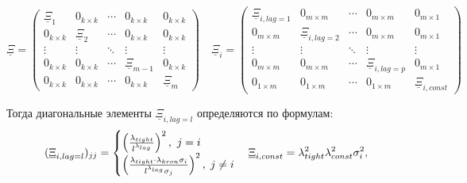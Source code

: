 \documentclass[11pt]{article} %
\newcommand{\prior}{\underline}
\begin{document}
\begin{equation*}
\prior \Xi=\begin{pmatrix}
\prior \Xi_1&0_{k\times k}&\cdots&0_{k\times k}&0_{k\times k}\\
0_{k\times k}& \prior \Xi_2& \cdots &0_{k\times k}&0_{k\times k}\\
\vdots &\vdots& \ddots&\vdots& \vdots\\
0_{k\times k}&0_{k\times k}&\cdots&\prior\Xi_{m-1} & 0_{k\times k}\\
0_{k\times k}&0_{k\times k}&\cdots&0_{k\times k}&\prior \Xi_m
\end{pmatrix}
\quad
\prior \Xi_i=\begin{pmatrix}
\prior \Xi_{i,lag=1}&0_{m\times m}&\cdots&0_{m\times m}&0_{m\times 1}\\
0_{m\times m}& \prior \Xi_{i,lag=2}& \cdots &0_{m\times m}&0_{m\times 1}\\
\vdots &\vdots& \ddots& \vdots&\vdots\\
0_{m\times m}&0_{m\times m}&\cdots&\prior \Xi_{i,lag=p}&0_{m\times 1}\\
0_{1\times m}&0_{1\times m}&\cdots&0_{1\times m}&\prior \Xi_{i,const}
\end{pmatrix}
\end{equation*}

Тогда  диагональные элементы  $\prior \Xi_{i,lag=l}$ определяются по формулам:
\begin{equation}
(\prior \Xi_{i,lag=l})_{jj}
=\begin{cases}
\left(\frac{\lambda_{tight}}{l^{\lambda_{lag}}}\right)^2,\ j=i\\
\left(\frac{\lambda_{tight}\cdot\lambda_{kron}\sigma_i}{l^{\lambda_{lag}}\sigma_j}\right)^2, \; j\ne i
\end{cases}\\
\prior \Xi_{i,const}
=\lambda_{tight}^2\lambda_{const}^2\sigma_i^2,
\label{minnesota_variance}
\end{equation}

\end{document}
